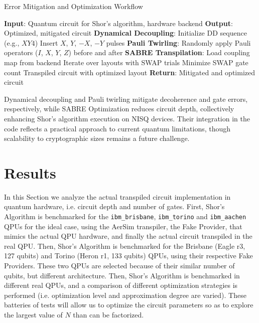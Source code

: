 \documentclass[conference,twoside]{IEEEtran}
\begin{document}
\begin{algorithm}
\caption{Error Mitigation and Optimization Workflow}
\begin{algorithmic}
\State \textbf{Input}: Quantum circuit for Shor's algorithm, hardware backend
\State \textbf{Output}: Optimized, mitigated circuit
\State \textbf{Dynamical Decoupling}:
    \State Initialize DD sequence (e.g., \(XY4\))
        \State Insert \(X\), \(Y\), \(-X\), \(-Y\) pulses
    \EndFor
\State \textbf{Pauli Twirling}:
        \State Randomly apply Pauli operators (\(I\), \(X\), \(Y\), \(Z\)) before and after
    \EndFor
\State \textbf{SABRE Transpilation}:
    \State Load coupling map from backend
    \State Iterate over layouts with SWAP trials
    \State Minimize SWAP gate count
    \State Transpiled circuit with optimized layout
\State \textbf{Return}: Mitigated and optimized circuit
\end{algorithmic}
\end{algorithm}

Dynamical decoupling and Pauli twirling mitigate decoherence and gate errors, respectively, while SABRE Optimization reduces circuit depth, collectively enhancing Shor's algorithm execution on NISQ devices. Their integration in the code reflects a practical approach to current quantum limitations, though scalability to cryptographic sizes remains a future challenge.

\section {Results}
In  this Section we analyze the actual transpiled circuit implementation in quantum hardware, i.e. circuit depth and number of gates. First, Shor’s Algorithm is benchmarked for the \texttt{ibm\_brisbane}, \texttt{ibm\_torino} and \texttt{ibm\_aachen} QPUs for the ideal case, using the AerSim transpiler, the Fake Provider, that mimics the actual QPU hardware, and finally the actual circuit transpiled in the real QPU. Then, Shor’s Algorithm is benchmarked for the Brisbane (Eagle r3, 127 qubits) and Torino (Heron r1, 133 qubits) QPUs, using their respective Fake Providers. These two QPUs are selected because of their similar number of qubits, but different architecture. Then, Shor’s Algorithm is benchmarked in different real QPUs, and a comparison of different optimization strategies is performed (i.e. optimization level and approximation degree are varied). These batteries of tests will allow us to optimize the circuit parameters so as to explore the largest value of $N$ than can be factorized.
\end{document}
